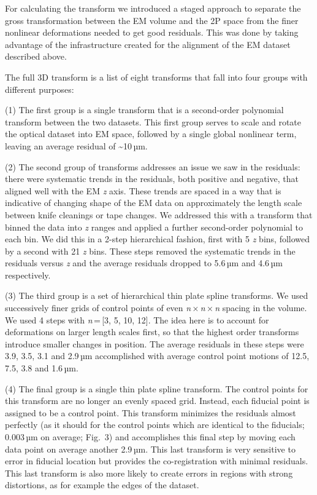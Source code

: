 \documentclass{article}
\begin{document}
For calculating the transform we introduced a staged approach to separate the gross transformation between the EM volume and the 2P space from the finer nonlinear deformations needed to get good residuals. This was done by taking advantage of the infrastructure created for the alignment of the EM dataset described above.

The full 3D transform is a list of eight transforms that fall into four groups with different purposes:

\begin{hangpars}
(1) The first group is a single transform that is a second-order polynomial transform between the two datasets. This first group serves to scale and rotate the optical dataset into EM space, followed by a single global nonlinear term, leaving an average residual of \textasciitilde{}10\,µm.

(2) The second group of transforms addresses an issue we saw in the residuals: there were systematic trends in the residuals, both positive and negative, that aligned well with the EM \emph{z} axis. These trends are spaced in a way that is indicative of changing shape of the EM data on approximately the length scale between knife cleanings or tape changes. We addressed this with a transform that binned the data into \emph{z} ranges and applied a further second-order polynomial to each bin. We did this in a 2-step hierarchical fashion, first with 5 \emph{z} bins, followed by a second with 21 \emph{z} bins. These steps removed the systematic trends in the residuals versus \emph{z} and the average residuals dropped to 5.6\,µm and 4.6\,µm respectively.

(3) The third group is a set of hierarchical thin plate spline transforms. We used successively finer grids of control points of even \emph{n}\,×\,\emph{n}\,×\,\emph{n} spacing in the volume. We used 4 steps with \emph{n}\,=\,[3, 5, 10, 12]. The idea here is to account for deformations on larger length scales first, so that the highest order transforms introduce smaller changes in position. The average residuals in these steps were 3.9, 3.5, 3.1 and 2.9\,µm accomplished with average control point motions of 12.5, 7.5, 3.8 and 1.6\,µm.

(4) The final group is a single thin plate spline transform. The control points for this transform are no longer an evenly spaced grid. Instead, each fiducial point is assigned to be a control point. This transform minimizes the residuals almost perfectly (as it should for the control points which are identical to the fiducials; 0.003\,µm on average; Fig.~3) and accomplishes this final step by moving each data point on average another 2.9\,µm. This last transform is very sensitive to error in fiducial location but provides the co-registration with minimal residuals. This last transform is also more likely to create errors in regions with strong distortions, as for example the edges of the dataset.
\end{hangpars}
\end{document}
